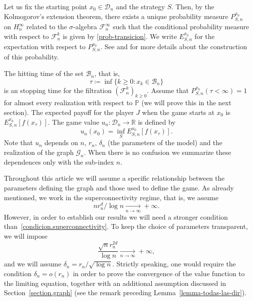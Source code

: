 \documentclass[11pt]{amsart}
\theoremstyle{definition}
\theoremstyle{remark}
\numberwithin{equation}{section}
\newcommand{\R}{{\mathbb R}}
\renewcommand{\P}{\mathbb{P}}
\newcommand{\G}{\mathcal{G}}
\newcommand{\Domain}{\mathcal{D}}
\newcommand{\B}{\mathcal{B}}
\newcommand{\Fc}{{\mathcal F}}
\begin{document}
Let us fix the starting point $x_0\in\Domain_n$ and the strategy $S$.
Then, by the Kolmogorov's extension theorem, there exists a unique probability measure $P_{S,n}^{x_0}$ on $H_n^{\infty}$ related to the $\sigma$-algebra $\Fc_n^{\infty}$ such that the conditional probability measure with respect to $\Fc_n^k$ is given by \eqref{prob-transicion}. 
We write $E_{S,n }^{x_0}$ for the expectation with respect to $P_{S,n}^{x_0}$.
See \cite[Ch. 7]{Blanc-Rossi} and \cite[Ch. 3]{Lewicka} for more details about the construction of this probability.

The hitting time of the set $\B_n$, that is, 
\begin{equation}
\tau \coloneqq \inf \{k\geq 0  \colon x_k\in \B_n \}
\end{equation}
is an stopping time for the filtration $(\Fc_n^k)_{k\geq 0}$.
Assume that $P_{S,n}^{x_0}(\tau < \infty)=1$ for almost every realization with respect to $\P$ (we will prove this in the next section).
The expected payoff for the player $J$ when the game starts at $x_0$ is $E_{S,n}^{x_0}[ f (x_{\tau})]$.
The game value $u_{n}\colon \Domain_n \to \R$ is defined by
\begin{equation}
\label{game.value}
u_{n}(x_0)
= 
\inf_{S} E_{S,n}^{x_0}[ f (x_{\tau})]
.
\end{equation}
Note that $u_{n}$ depends on $n$, $r_n$, $\delta_n$ (the parameters of the model) and the realization of the graph $\G_n$.
When there is no confusion we summarize these dependences only with the sub-index $n$.

Throughout this article we will assume a specific relationship between the parameters defining the graph and those used to define the game.
As already mentioned, we work in the superconnectivity regime, that is, we assume 
\begin{equation}
\label{condicion.superconnectivity}
nr_n^d/\log n \xrightarrow[n\to\infty]{} +\infty.
\end{equation}
However, in order to establish our results we will need a stronger condition than~\eqref{condicion.superconnectivity}.
To keep the choice of parameters transparent, we will impose
\begin{equation}
\label{condicion.parametros}
\frac{\sqrt{n} r_n^{2d}}{\log n}
 \xrightarrow[n\to\infty]{} 
 +\infty
,
\end{equation}
and we will assume $\delta_n=r_n/\sqrt{\log n}$.
Strictly speaking, one would require the condition $\delta_n=o(r_n)$ in order to prove the convergence of the value function to the limiting equation, together with an additional assumption discussed in Section~\ref{section.graph} (see the remark preceding Lemma~\ref{lemma-todas-las-dir}).
\end{document}
